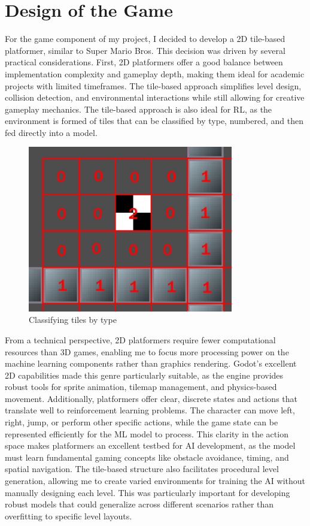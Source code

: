 \section{Design of the Game}

For the game component of my project, I decided to develop a 2D tile-based platformer, similar to Super Mario Bros. 
This decision was driven by several practical considerations. 
First, 2D platformers offer a good balance between implementation complexity and gameplay depth, making them ideal for academic projects with limited timeframes.
The tile-based approach simplifies level design, collision detection, and environmental interactions while still allowing for creative gameplay mechanics. 
The tile-based approach is also ideal for RL, as the environment is formed of tiles that can be classified by type, numbered, and then fed directly into a model.

\begin{figure}[H]
    \centering
    \includegraphics[width=0.8\textwidth]{figures/tilemap.png}
    \caption{Classifying tiles by type}
    \label{fig:tilemap}
\end{figure}

From a technical perspective, 2D platformers require fewer computational resources than 3D games, enabling me to focus more processing power on the machine learning components rather than graphics rendering. 
Godot's excellent 2D capabilities made this genre particularly suitable, as the engine provides robust tools for sprite animation, tilemap management, and physics-based movement.
Additionally, platformers offer clear, discrete states and actions that translate well to reinforcement learning problems. 
The character can move left, right, jump, or perform other specific actions, while the game state can be represented efficiently for the ML model to process.
This clarity in the action space makes platformers an excellent testbed for AI development, as the model must learn fundamental gaming concepts like obstacle avoidance, timing, and spatial navigation.
The tile-based structure also facilitates procedural level generation, allowing me to create varied environments for training the AI without manually designing each level. 
This was particularly important for developing robust models that could generalize across different scenarios rather than overfitting to specific level layouts.

